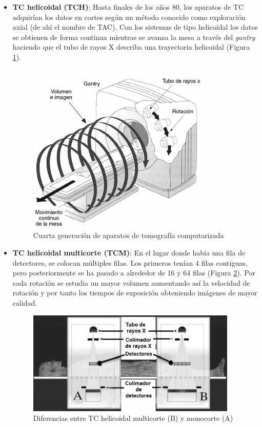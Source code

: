 \begin{itemize}
	\item \textbf{TC helicoidal (TCH)}: Hasta finales de los años 80, los aparatos de TC adquirían los datos en cortes según un método conocido como exploración axial (de ahí el nombre de TAC). Con los sistemas de tipo helicoidal los datos se obtienen de forma continua mientras se avanza la mesa a través del \textit{gantry} haciendo que el tubo de rayos X describa una trayectoria helicoidal (Figura \ref{fig:introduccion/tch}).
	
	\begin{figure}[H]
		\centering
		\includegraphics[width=9cm]{imagenes/introduccion/tch}
		\caption{Cuarta generación de aparatos de tomografía computarizada \cite{historia-tomografia}}
		\label{fig:introduccion/tch}
	\end{figure}
	
	\item \textbf{TC helicoidal multicorte (TCM)}: En el lugar donde había una fila de detectores, se colocan múltiples filas. Los primeros tenían 4 filas contiguas, pero posteriormente se ha pasado a alrededor de 16 y 64 filas (Figura \ref{fig:introduccion/tcm}). Por cada rotación se estudia un mayor volumen aumentando así la velocidad de rotación y por tanto los tiempos de exposición obteniendo imágenes de mayor calidad.
	
	\begin{figure}[H]
		\centering
		\includegraphics[width=10cm]{imagenes/introduccion/tcm}
		\caption{Diferencias entre TC helicoidal multicorte (B) y monocorte (A) \cite{tc-esculturas}}
		\label{fig:introduccion/tcm}
	\end{figure}


\end{itemize}
